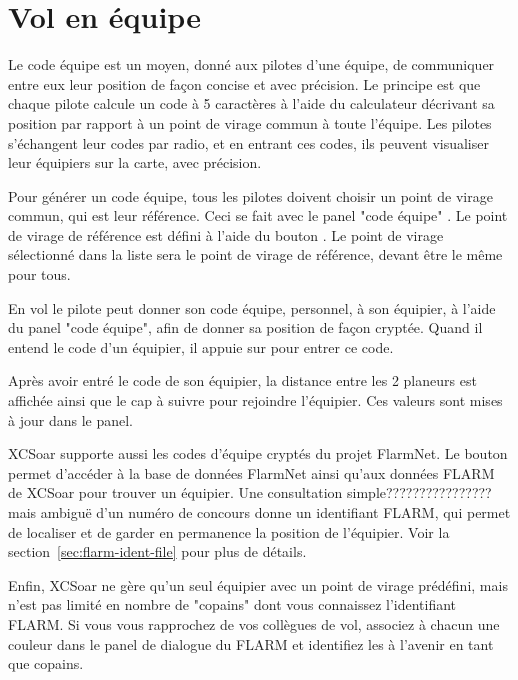 \section{Vol en équipe}\label{sec:team-flying}

Le code équipe est un moyen, donné aux pilotes d'une équipe, de communiquer entre eux leur position de façon concise et avec précision. Le principe est que chaque pilote calcule un code à 5 caractères à l'aide du calculateur décrivant sa position par rapport à un point de virage commun à toute l'équipe. Les pilotes s'échangent leur codes par radio, et en entrant ces codes, ils peuvent visualiser leur équipiers sur la carte, avec précision.

Pour générer un code équipe, tous les pilotes doivent choisir un point de virage commun, qui est leur référence. Ceci se fait avec le panel "code équipe" \blink{}. Le point de virage de référence est défini à l'aide du bouton . Le point de virage sélectionné dans la liste sera le point de virage de référence, devant être le même pour tous.

En vol le pilote peut donner son code équipe, personnel, à son équipier, à l'aide du panel "code équipe", afin de donner sa position de façon cryptée. Quand il entend le code d'un équipier, il appuie sur  pour entrer ce code.


Après avoir entré le code de son équipier, la distance entre les 2 planeurs est affichée ainsi que le cap à suivre pour rejoindre l'équipier. Ces valeurs sont mises à jour dans le panel.

XCSoar supporte aussi les codes d'équipe cryptés du projet FlarmNet. Le bouton  permet d'accéder à la base de données FlarmNet ainsi qu'aux données FLARM de XCSoar pour trouver un équipier. Une consultation simple???????????????? mais ambiguë d'un numéro de concours donne un identifiant FLARM, qui permet de localiser et de garder en permanence la position de l'équipier. Voir la section~\ref{sec:flarm-ident-file} pour plus de détails.

Enfin, XCSoar ne gère qu'un seul équipier avec un point de virage prédéfini, mais n'est pas limité en nombre de "copains" dont vous connaissez l'identifiant FLARM. Si vous vous rapprochez de vos collègues de vol, associez à chacun une couleur dans le panel de dialogue du FLARM et identifiez les à l'avenir en tant que copains.




